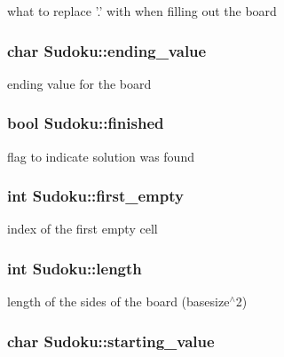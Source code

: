 what to replace '.' with when filling out the board \hypertarget{classSudoku_a303d3b9e8bf9ae3f2733648cb2e85c09}{
\subsubsection[{ending\-\_\-value}]{\setlength{\rightskip}{0pt plus 5cm}char Sudoku\-::ending\-\_\-value\hspace{0.3cm}{\ttfamily [private]}}}\label{classSudoku_a303d3b9e8bf9ae3f2733648cb2e85c09}
ending value for the board \hypertarget{classSudoku_a21c5551563e8963784c949772b2bc684}{
\subsubsection[{finished}]{\setlength{\rightskip}{0pt plus 5cm}bool Sudoku\-::finished\hspace{0.3cm}{\ttfamily [private]}}}\label{classSudoku_a21c5551563e8963784c949772b2bc684}
flag to indicate solution was found \hypertarget{classSudoku_ac25a6f7bcd1b179b63d4d14a111fcfca}{
\subsubsection[{first\-\_\-empty}]{\setlength{\rightskip}{0pt plus 5cm}int Sudoku\-::first\-\_\-empty\hspace{0.3cm}{\ttfamily [private]}}}\label{classSudoku_ac25a6f7bcd1b179b63d4d14a111fcfca}
index of the first empty cell \hypertarget{classSudoku_a80bd89d6732a9c2eae7acec7bacd18c6}{
\subsubsection[{length}]{\setlength{\rightskip}{0pt plus 5cm}int Sudoku\-::length\hspace{0.3cm}{\ttfamily [private]}}}\label{classSudoku_a80bd89d6732a9c2eae7acec7bacd18c6}
length of the sides of the board (basesize$^\wedge$2) \hypertarget{classSudoku_a5a3590e872546b88aab9057476c8c78d}{
\subsubsection[{starting\-\_\-value}]{\setlength{\rightskip}{0pt plus 5cm}char Sudoku\-::starting\-\_\-value\hspace{0.3cm}{\ttfamily [private]}}}\label{classSudoku_a5a3590e872546b88aab9057476c8c78d}
